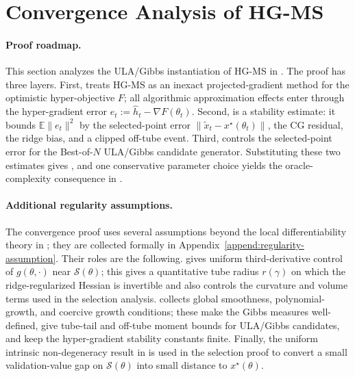 \documentclass{article}
\theoremstyle{normaltheorem}
\newcommand{\calS}{\mathcal{S}}
\begin{document}
\section{Convergence Analysis of HG-MS}\label{sec:theory}

\paragraph{Proof roadmap.}
This section analyzes the ULA/Gibbs instantiation of \textsc{HG-MS} in .
The proof has three layers. First,  treats \textsc{HG-MS} as an inexact projected-gradient
method for the optimistic hyper-objective \(F\); all algorithmic approximation effects enter through the hyper-gradient
error \(e_t:=\widehat h_t-\nabla F(\theta_t)\). Second,  is a stability estimate: it bounds
\(\mathbb E\|e_t\|^2\) by the selected-point error \(\|\tilde x_t-x^\star(\theta_t)\|\), the CG residual, the ridge bias,
and a clipped off-tube event. Third,  controls the selected-point error for the
Best-of-\(N\) ULA/Gibbs candidate generator. Substituting these two estimates gives , and one
conservative parameter choice yields the oracle-complexity consequence in .

\paragraph{Additional regularity assumptions.}
The convergence proof uses several assumptions beyond the local differentiability theory in ; they
are collected formally in Appendix~\ref{append:regularity-assumption}. Their roles are the following.
 gives uniform third-derivative control of \(g(\theta,\cdot)\) near \(\calS(\theta)\); this gives a
quantitative tube radius \(r(\gamma)\) on which the ridge-regularized Hessian is invertible and also controls the
curvature and volume terms used in the selection analysis.  collects global smoothness,
polynomial-growth, and coercive growth conditions; these make the Gibbs measures well-defined, give tube-tail and
off-tube moment bounds for ULA/Gibbs candidates, and keep the hyper-gradient stability constants finite.
Finally, the uniform intrinsic non-degeneracy result in  is used in the selection proof to
convert a small validation-value gap on \(\calS(\theta)\) into small distance to \(x^\star(\theta)\).
\end{document}
